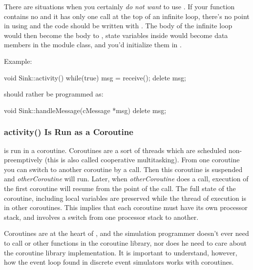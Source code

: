 There are situations when you certainly \textit{do not want} to use .
If your  function contains no  and it has
only one  call at the top of an infinite loop,
there's no point in using  and the code should be written
with .
The body of the infinite loop would then become the body to ,
state variables inside  would become data members in
the module class, and you'd initialize them in .

Example:

\begin{cpp}
void Sink::activity()
{
    while(true)
    {
        msg = receive();
        delete msg;
    }
}
\end{cpp}

should rather be programmed as:

\begin{cpp}
void Sink::handleMessage(cMessage *msg)
{
    delete msg;
}
\end{cpp}



\subsubsection{activity() Is Run as a Coroutine}


 is run in a coroutine.
Coroutines are a sort of threads which are scheduled
non-preemptively (this is also called cooperative
multitasking). From one coroutine you
can switch to another coroutine by a
 call. Then this
coroutine is suspended and \textit{otherCoroutine} will run. Later,
when \textit{otherCoroutine} does a
 call, execution of
the first coroutine will resume from the point of the
 call.  The full state
of the coroutine, including local variables are preserved while the
thread of execution is in other coroutines.  This implies that each
coroutine must have its own processor stack, and
 involves a switch from one processor stack to
another.


Coroutines are at the heart of {\opp}, and the
simulation programmer doesn't ever need to call 
or other functions in the coroutine library, nor does he need to care
about the coroutine library implementation. It is important to
understand, however, how the event loop found in discrete event simulators
works with coroutines.


